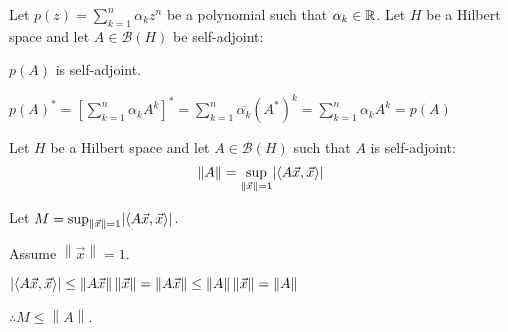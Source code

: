 \documentclass[letterpaper,12pt,fleqn]{article}
\newcommand{\mb}{\mathcal{B}}
\newcommand{\norm}[1]{\left\|#1\right\|}
\newcommand{\inner}[1]{\left<#1\right>}
\newcommand{\conj}[1]{\overline{#1}}
\newcommand{\vx}{\vec{x}}
\renewcommand{\a}{\alpha}
\begin{document}
\begin{corollary}
  Let $p(z)=\sum_{k=1}^n\a_kz^n$ be a polynomial such that $\a_k\in\R$. Let $H$
  be a Hilbert space and let $A\in\mb(H)$ be self-adjoint:

  \qquad$p(A)$ is self-adjoint.
\end{corollary}

\begin{theproof}
  $p(A)^*=\left[\sum_{k=1}^n\a_kA^k\right]^*=\sum_{k=1}^n\conj{\a_k}(A^*)^k=
  \sum_{k=1}^n\a_kA^k=p(A)$
\end{theproof}

\begin{theorem}
  Let $H$ be a Hilbert space and let $A\in\mb(H)$ such that $A$ is
  self-adjoint:
  \[\norm{A}=\sup_{\norm{\vx}=1}\abs{\inner{A\vx,\vx}}\]
\end{theorem}

\begin{theproof}
  Let $M=\sup_{\norm{\vx}=1}\abs{\inner{A\vx,\vx}}$.
  
  Assume $\norm{\vx}=1$.

  $\abs{\inner{A\vx,\vx}}\le\norm{A\vx}\norm{\vx}=\norm{A\vx}\le
  \norm{A}\norm{\vx}=\norm{A}$

  $\therefore M\le\norm{A}$.
\end{theproof}
\end{document}
